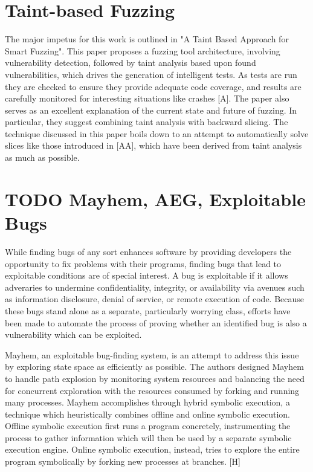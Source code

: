 \documentclass[11pt,expanded,copyright]{fsuthesis}
\begin{document}




\section{Taint-based Fuzzing}

The major impetus for this work is outlined in "A Taint Based Approach for Smart Fuzzing". This paper proposes a fuzzing tool architecture, involving vulnerability detection, followed by taint analysis based upon found vulnerabilities, which drives the generation of intelligent tests. As tests are run they are checked to ensure they provide adequate code coverage, and results are carefully monitored for interesting situations like crashes [A]. The paper also serves as an excellent explanation of the current state and future of fuzzing. In particular, they suggest combining taint analysis with backward slicing. The technique discussed in this paper boils down to an attempt to automatically solve slices like those introduced in [AA], which have been derived from taint analysis as much as possible.

\section{TODO Mayhem, AEG, Exploitable Bugs}


While finding bugs of any sort enhances software by providing developers the opportunity to fix problems with their programs, finding bugs that lead to exploitable conditions are of special interest. A bug is exploitable if it allows adveraries to undermine confidentiality, integrity, or availability via avenues such as information disclosure, denial of service, or remote execution of code. Because these bugs stand alone as a separate, particularly worrying class, efforts have been made to automate the process of proving whether an identified bug is also a vulnerability which can be exploited.

Mayhem, an exploitable bug-finding system, is an attempt to address this issue by exploring state space as efficiently as possible. The authors designed Mayhem to handle path explosion by monitoring system resources and balancing the need for concurrent exploration with the resources consumed by forking and running many processes. Mayhem accomplishes through hybrid symbolic execution, a technique which heuristically combines offline and online symbolic execution. Offline symbolic execution first runs a program concretely, instrumenting the process to gather information which will then be used by a separate symbolic execution engine. Online symbolic execution, instead, tries to explore the entire program symbolically by forking new processes at branches. [H]
\end{document}
